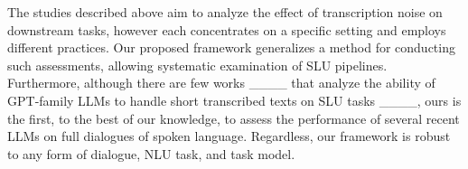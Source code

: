 The studies described above aim to analyze the effect of transcription noise on downstream tasks, however each concentrates on a specific setting and employs different practices. Our proposed framework generalizes a method for conducting such assessments, allowing systematic examination of SLU pipelines.
Furthermore, although there are few works ____ that analyze the ability of GPT-family LLMs to handle short transcribed texts on SLU tasks ____, ours is the first, to the best of our knowledge, to assess the performance of several recent LLMs on full dialogues of spoken language. Regardless, our framework is robust to any form of dialogue, NLU task, and task model.













